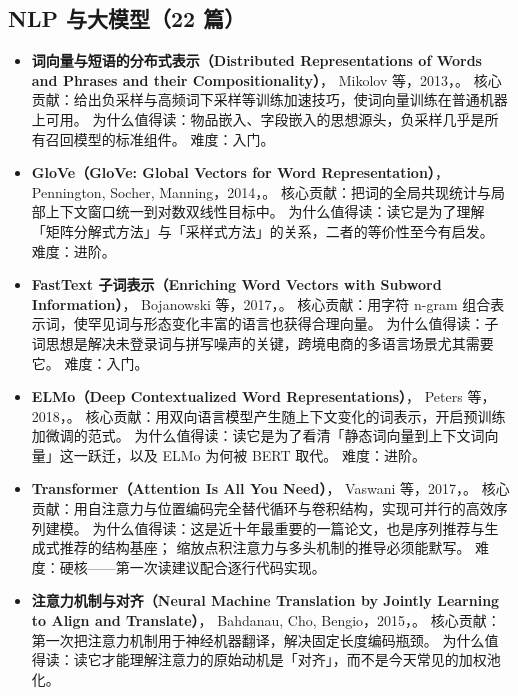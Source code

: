 \subsection{NLP 与大模型（22 篇）}

\begin{itemize}
  \item \textbf{词向量与短语的分布式表示（Distributed Representations of Words and Phrases and their Compositionality）}，
        Mikolov 等，2013，\cite{mikolov2013word2vec}。
        核心贡献：给出负采样与高频词下采样等训练加速技巧，使词向量训练在普通机器上可用。
        为什么值得读：物品嵌入、字段嵌入的思想源头，负采样几乎是所有召回模型的标准组件。
        难度：入门。
  \item \textbf{GloVe（GloVe: Global Vectors for Word Representation）}，
        Pennington, Socher, Manning，2014，\cite{pennington2014glove}。
        核心贡献：把词的全局共现统计与局部上下文窗口统一到对数双线性目标中。
        为什么值得读：读它是为了理解「矩阵分解式方法」与「采样式方法」的关系，二者的等价性至今有启发。
        难度：进阶。
  \item \textbf{FastText 子词表示（Enriching Word Vectors with Subword Information）}，
        Bojanowski 等，2017，\cite{bojanowski2017fasttext}。
        核心贡献：用字符 n-gram 组合表示词，使罕见词与形态变化丰富的语言也获得合理向量。
        为什么值得读：子词思想是解决未登录词与拼写噪声的关键，跨境电商的多语言场景尤其需要它。
        难度：入门。
  \item \textbf{ELMo（Deep Contextualized Word Representations）}，
        Peters 等，2018，\cite{peters2018elmo}。
        核心贡献：用双向语言模型产生随上下文变化的词表示，开启预训练加微调的范式。
        为什么值得读：读它是为了看清「静态词向量到上下文词向量」这一跃迁，以及 ELMo 为何被 BERT 取代。
        难度：进阶。
  \item \textbf{Transformer（Attention Is All You Need）}，
        Vaswani 等，2017，\cite{vaswani2017attention}。
        核心贡献：用自注意力与位置编码完全替代循环与卷积结构，实现可并行的高效序列建模。
        为什么值得读：这是近十年最重要的一篇论文，也是序列推荐与生成式推荐的结构基座；
        缩放点积注意力与多头机制的推导必须能默写。
        难度：硬核——第一次读建议配合逐行代码实现。
  \item \textbf{注意力机制与对齐（Neural Machine Translation by Jointly Learning to Align and Translate）}，
        Bahdanau, Cho, Bengio，2015，\cite{bahdanau2015attention}。
        核心贡献：第一次把注意力机制用于神经机器翻译，解决固定长度编码瓶颈。
        为什么值得读：读它才能理解注意力的原始动机是「对齐」，而不是今天常见的加权池化。

\end{itemize}
